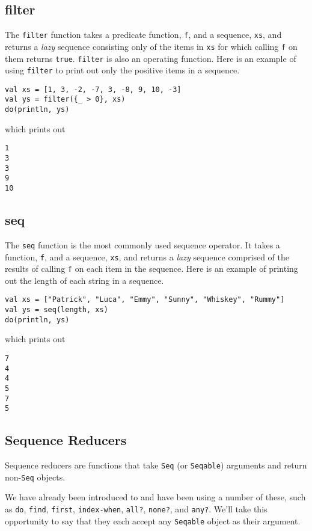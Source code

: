 \documentclass[10pt,oneside]{book}
\begin{document}
\subsection*{filter}
The \texttt{\frenchspacing filter} function takes a predicate function, \texttt{\frenchspacing f}, and a sequence, \texttt{\frenchspacing xs}, and returns a {\em lazy} sequence consisting only of the items in \texttt{\frenchspacing xs} for which calling \texttt{\frenchspacing f} on them returns \texttt{\frenchspacing true}. \texttt{\frenchspacing filter} is also an operating function.
Here is an example of using \texttt{\frenchspacing filter} to print out only the positive items in a sequence.
\begin{lstlisting}
val xs = [1, 3, -2, -7, 3, -8, 9, 10, -3]
val ys = filter({_ > 0}, xs)
do(println, ys)   
\end{lstlisting}
which prints out
\begin{lstlisting}
1
3
3
9
10
\end{lstlisting}

\subsection*{seq}
The \texttt{\frenchspacing seq} function is the most commonly used sequence operator. It takes a function, \texttt{\frenchspacing f}, and a sequence, \texttt{\frenchspacing xs}, and returns a {\em lazy} sequence comprised of the results of calling \texttt{\frenchspacing f} on each item in the sequence.
Here is an example of printing out the length of each string in a sequence.
\begin{lstlisting}
val xs = ["Patrick", "Luca", "Emmy", "Sunny", "Whiskey", "Rummy"]
val ys = seq(length, xs)
do(println, ys)
\end{lstlisting}
which prints out
\begin{lstlisting}
7
4
4
5
7
5
\end{lstlisting}

\subsection*{Sequence Reducers}
Sequence reducers are functions that take \texttt{\frenchspacing Seq} (or \texttt{\frenchspacing Seqable}) arguments and return non-\texttt{\frenchspacing Seq} objects. 

We have already been introduced to and have been using a number of these, such as \texttt{\frenchspacing do}, \texttt{\frenchspacing find}, \texttt{\frenchspacing first}, \texttt{\frenchspacing index-when}, \texttt{\frenchspacing all?}, \texttt{\frenchspacing none?}, and \texttt{\frenchspacing any?}. We'll take this opportunity to say that they each accept any \texttt{\frenchspacing Seqable} object as their argument. 
\end{document}
